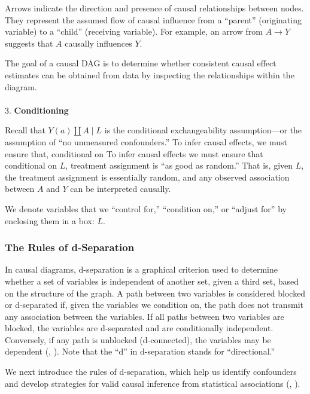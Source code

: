 \documentclass[
  singlecolumn]{article}
\makeatletter
\let\oldparagraph\paragraph
\renewcommand{\paragraph}{
    \@ifstar
      \xxxParagraphStar
      \xxxParagraphNoStar
  }
\newcommand{\xxxParagraphStar}[1]{\oldparagraph*{#1}\mbox{}}
\newcommand{\xxxParagraphNoStar}[1]{\oldparagraph{#1}\mbox{}}
\makeatother
\begin{document}
Arrows indicate the direction and presence of causal relationships
between nodes. They represent the assumed flow of causal influence from
a ``parent'' (originating variable) to a ``child'' (receiving variable).
For example, an arrow from \(A \rightarrow Y\) suggests that \(A\)
causally influences \(Y\).

The goal of a causal DAG is to determine whether consistent causal
effect estimates can be obtained from data by inspecting the
relationships within the diagram.

\paragraph{\texorpdfstring{3.
\textbf{Conditioning}}{3. Conditioning}}\label{conditioning}

Recall that \(Y(a) \coprod A \mid L\) is the conditional exchangeability
assumption---or the assumption of ``no unmeasured confounders.'' To
infer causal effects, we must ensure that, conditional on To infer
causal effects we must ensure that conditional on \(L\), treatment
assignment is ``as good as random.'' That is, given \(L\), the treatment
assignment is essentially random, and any observed association between
\(A\) and \(Y\) can be interpreted causally.

We denote variables that we ``control for,'' ``condition on,'' or
``adjust for'' by enclosing them in a box: \(\boxed{L}\).

\subsubsection{The Rules of
d-Separation}\label{the-rules-of-d-separation}

In causal diagrams, d-separation is a graphical criterion used to
determine whether a set of variables is independent of another set,
given a third set, based on the structure of the graph. A path between
two variables is considered blocked or d-separated if, given the
variables we condition on, the path does not transmit any association
between the variables. If all paths between two variables are blocked,
the variables are d-separated and are conditionally independent.
Conversely, if any path is unblocked (d-connected), the variables may be
dependent (,
). Note that the ``d'' in d-separation
stands for ``directional.''

We next introduce the rules of d-separation, which help us identify
confounders and develop strategies for valid causal inference from
statistical associations (,
).
\end{document}
